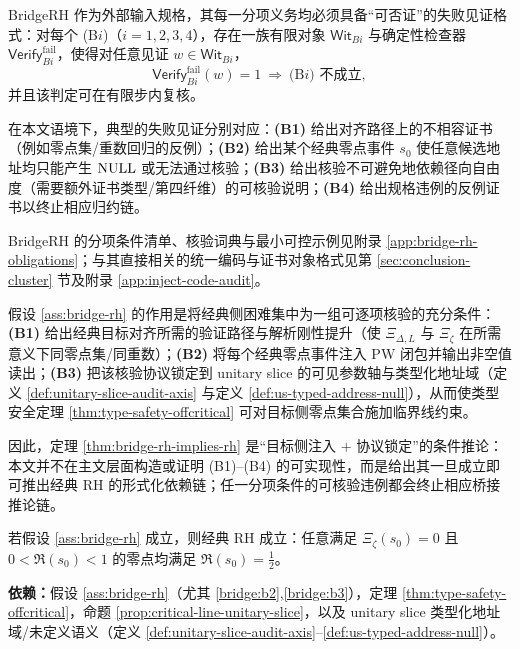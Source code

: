 \begin{definition}\label{def:bridge-failure-witness}
BridgeRH 作为外部输入规格，其每一分项义务均必须具备“可否证”的失败见证格式：对每个 (B$i$)（$i=1,2,3,4$），存在一族有限对象 $\mathsf{Wit}_{B i}$ 与确定性检查器 $\mathsf{Verify}_{B i}^{\mathrm{fail}}$，使得对任意见证 $w\in\mathsf{Wit}_{B i}$，
$$
\mathsf{Verify}_{B i}^{\mathrm{fail}}(w)=1\ \Longrightarrow\ \text{(B$i$) 不成立},
$$
并且该判定可在有限步内复核。\par
在本文语境下，典型的失败见证分别对应：\textbf{(B1)} 给出对齐路径上的不相容证书（例如零点集/重数回归的反例）；\textbf{(B2)} 给出某个经典零点事件 $s_0$ 使任意候选地址均只能产生 $\mathrm{NULL}$ 或无法通过核验；\textbf{(B3)} 给出核验不可避免地依赖径向自由度（需要额外证书类型/第四纤维）的可核验说明；\textbf{(B4)} 给出规格违例的反例证书以终止相应归约链。
\end{definition}

BridgeRH 的分项条件清单、核验词典与最小可控示例见附录 \ref{app:bridge-rh-obligations}；与其直接相关的统一编码与证书对象格式见第 \ref{sec:conclusion-cluster} 节及附录 \ref{app:inject-code-audit}。

\begin{remark}\label{rem:bridge-rh-strength}
假设 \ref{ass:bridge-rh} 的作用是将经典侧困难集中为一组可逐项核验的充分条件：\textbf{(B1)} 给出经典目标对齐所需的验证路径与解析刚性提升（使 $\Xi_{\Delta,L}$ 与 $\Xi_\zeta$ 在所需意义下同零点集/同重数）；\textbf{(B2)} 将每个经典零点事件注入 PW 闭包并输出非空值读出；\textbf{(B3)} 把该核验协议锁定到 unitary slice 的可见参数轴与类型化地址域（定义 \ref{def:unitary-slice-audit-axis} 与定义 \ref{def:us-typed-address-null}），从而使类型安全定理 \ref{thm:type-safety-offcritical} 可对目标侧零点集合施加临界线约束。\par
因此，定理 \ref{thm:bridge-rh-implies-rh} 是“目标侧注入 $+$ 协议锁定”的条件推论：本文并不在主文层面构造或证明 (B1)--(B4) 的可实现性，而是给出其一旦成立即可推出经典 RH 的形式化依赖链；任一分项条件的可核验违例都会终止相应桥接推论链。
\end{remark}

\begin{theorem}\label{thm:bridge-rh-implies-rh}
若假设 \ref{ass:bridge-rh} 成立，则经典 RH 成立：任意满足 $\Xi_\zeta(s_0)=0$ 且 $0<\Re(s_0)<1$ 的零点均满足 $\Re(s_0)=\tfrac12$。
\par\noindent\textnormal{\textbf{依赖：}假设 \ref{ass:bridge-rh}（尤其 \ref{bridge:b2},\ref{bridge:b3}），定理 \ref{thm:type-safety-offcritical}，命题 \ref{prop:critical-line-unitary-slice}，以及 unitary slice 类型化地址域/未定义语义（定义 \ref{def:unitary-slice-audit-axis}--\ref{def:us-typed-address-null}）。}
\end{theorem}

